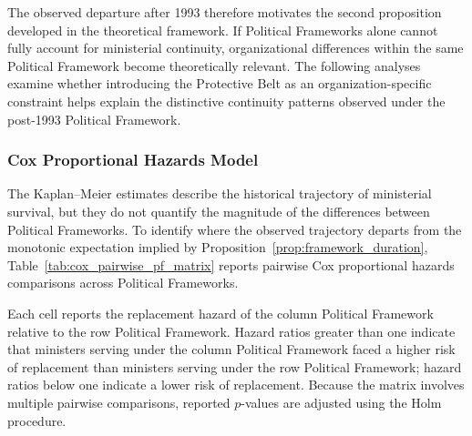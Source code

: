 \documentclass[doc, 12pt, a4paper,floatsintext]{apa7}
\begin{document}
The observed departure after 1993 therefore motivates the second proposition developed in the theoretical framework. If Political Frameworks alone cannot fully account for ministerial continuity, organizational differences within the same Political Framework become theoretically relevant. The following analyses examine whether introducing the Protective Belt as an organization-specific constraint helps explain the distinctive continuity patterns observed under the post-1993 Political Framework.
%
%
%
%
%
\subsubsection{Cox Proportional Hazards Model}

The Kaplan--Meier estimates describe the historical trajectory of ministerial survival, but they do not quantify the magnitude of the differences between Political Frameworks. To identify where the observed trajectory departs from the monotonic expectation implied by Proposition~\ref{prop:framework_duration}, Table~\ref{tab:cox_pairwise_pf_matrix} reports pairwise Cox proportional hazards comparisons across Political Frameworks.

Each cell reports the replacement hazard of the column Political Framework relative to the row Political Framework. Hazard ratios greater than one indicate that ministers serving under the column Political Framework faced a higher risk of replacement than ministers serving under the row Political Framework; hazard ratios below one indicate a lower risk of replacement. Because the matrix involves multiple pairwise comparisons, reported $p$-values are adjusted using the Holm procedure.
\end{document}
